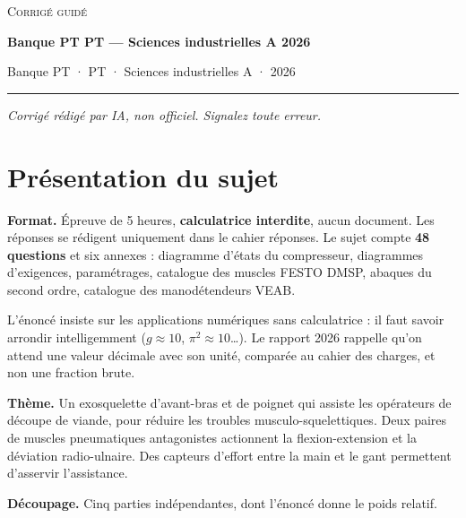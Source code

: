 \documentclass[11pt,a4paper]{article}
\begin{document}
\thispagestyle{plain}
\begin{center}
  {\small\scshape Corrigé guidé}\par\smallskip
  {\LARGE\bfseries Banque PT PT — Sciences industrielles A 2026\par}\medskip
  {\large Banque PT · PT · Sciences industrielles A · 2026\par}
\end{center}
\vspace{2pt}\hrule\vspace{8pt}

\emph{Corrigé rédigé par IA, non officiel. Signalez toute erreur.}

\hypertarget{pruxe9sentation-du-sujet}{%
\section{Présentation du sujet}\label{pruxe9sentation-du-sujet}}

\textbf{Format.} Épreuve de 5 heures, \textbf{calculatrice interdite}, aucun document. Les réponses se rédigent uniquement dans le cahier réponses. Le sujet compte \textbf{48 questions} et six annexes : diagramme d'états du compresseur, diagrammes d'exigences, paramétrages, catalogue des muscles FESTO DMSP, abaques du second ordre, catalogue des manodétendeurs VEAB.

L'énoncé insiste sur les applications numériques sans calculatrice : il faut savoir arrondir intelligemment (\(g\approx10\), \(\pi^2\approx10\)\ldots). Le rapport 2026 rappelle qu'on attend une valeur décimale avec son unité, comparée au cahier des charges, et non une fraction brute.

\textbf{Thème.} Un exosquelette d'avant-bras et de poignet qui assiste les opérateurs de découpe de viande, pour réduire les troubles musculo-squelettiques. Deux paires de muscles pneumatiques antagonistes actionnent la flexion-extension et la déviation radio-ulnaire. Des capteurs d'effort entre la main et le gant permettent d'asservir l'assistance.

\textbf{Découpage.} Cinq parties indépendantes, dont l'énoncé donne le poids relatif.
\end{document}
